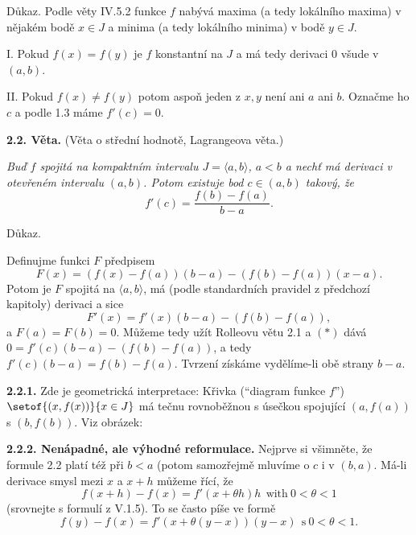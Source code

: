 \documentclass[12pt]{article}
\begin{document}
{{  Důkaz.} Podle věty IV.5.2 funkce $f$ nabývá maxima (a tedy lokálního maxima)  v nějakém bodě $x\in J$ a minima (a tedy lokálního minima) v bodě $y\in J$.
  
  \smallskip
  
  I. Pokud $f(x)=f(y)$ je $f$ konstantní na $J$ a má tedy derivaci $0$ všude v $(a,b)$.
 
 \smallskip
 
 II. Pokud $f(x)\neq f(y)$ potom aspoň jeden z $x,y$ není ani $a$ ani $b$. Označme ho $c$ a podle 1.3 máme $f'(c)=0$. \sq
 
 \bigskip
 
 {\bf 2.2. Věta.} (Věta o střední hodnotě, Lagrangeova věta.) {\em Buď $f$ spojitá na kompaktním intervalu $J=\langle a,b\rangle$, $a<b$ a   nechť má derivaci v otevřeném intervalu
  $(a,b)$. Potom existuje bod $c\in (a,b)$ takový, že
  $$
  f'(c)=\frac{f(b)-f(a)}{b-a}.
  $$
	
	 Důkaz.} Definujme funkci $F$ 
  předpisem
  $$
  F(x)=(f(x)-f(a))(b-a)- (f(b)-f(a))(x-a).
  $$
  Potom je $F$ spojitá na $\langle a,b\rangle$, má (podle standardních pravidel z předchozí kapitoly) derivaci a sice
  \begin{equation}
  F'(x)=f'(x)(b-a)-(f(b)-f(a)), \tag{$*$}
  \end{equation}
  a $F(a)=F(b) =0$. Můžeme tedy užít Rolleovu větu 2.1 a $(*)$ dává
 $0=f'(c)(b-a)-(f(b)-f(a))$, a tedy $f'(c)(b-a)=f(b)-f(a)$. Tvrzení získáme vydělíme-li obě strany  $b-a$. \sq
 
 \medskip
 
 {\bf 2.2.1.} Zde je geometrická interpretace: Křivka (``diagram funkce $f$'') $\setof{(x,f(x))}{x\in J}$ má  tečnu rovnoběžnou s úse\v ckou spojující $(a,f(a))$ s $(b,f(b))$. Viz obrázek:
 
   \centerline{
}

\vskip10mm

{\bf 2.2.2. Nenápadné,  ale  výhodné  reformulace.} Nejprve si všimněte, že formule 2.2 platí též při $b<a$ (potom samozřejmě mluvíme o  $c$ i v $(b,a)$. Má-li derivace smysl mezi $x$ a $x+h$ můžeme řící, že
$$
f(x+h)-f(x)=f'(x+\theta h)h \ \ \text{with} \ 0<\theta<1
$$
(srovnejte s formulí z V.1.5). To se často píše ve formě
$$
f(y)-f(x)=f'(x+\theta(y-x))(y-x) \ \ \text{s} \ 0<\theta<1.
$$

}
\end{document}
